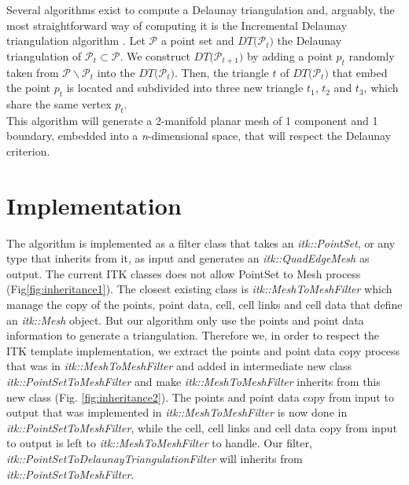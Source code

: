 \documentclass{InsightArticle}
\begin{document}
Several algorithms exist to compute a Delaunay triangulation and, arguably, the most straightforward way of computing it is the Incremental Delaunay triangulation algorithm \cite{Devillers1998}. Let $\mathcal{P}$ a point set and $\mathit{DT(} \mathcal{P_{\mathit{t}}} \mathit{)}$ the Delaunay triangulation of $\mathcal{P_{\mathit{t}}}\subset\mathcal{P}$. We construct $\mathit{DT(} \mathcal{P_{\mathit{t+1}}} \mathit{)}$ by adding a point $\mathit{p_{t}}$ randomly taken from $\mathcal{P} \backslash \mathcal{P_{\mathit{t}}}$ into the $\mathit{DT(} \mathcal{P_{\mathit{t}}} \mathit{)}$. Then, the triangle $\mathit{t}$ of $\mathit{DT(} \mathcal{P_{\mathit{t}}} \mathit{)}$ that embed the point $\mathit{p_{t}}$ is located and subdivided into three new triangle $\mathit{t_{1}}$, $\mathit{t_{2}}$ and $\mathit{t_{3}}$, which share the same vertex $\mathit{p_{t}}$.\\

This algorithm will generate a 2-manifold planar mesh of 1 component and 1 boundary, embedded into a \emph{n}-dimensional space, that will respect the Delaunay criterion.

\section{Implementation}

The algorithm is implemented as a filter class that takes an \emph{itk::PointSet}, or any type that inherits from it, as input and generates an \emph{itk::QuadEdgeMesh} as output. The current ITK classes does not allow PointSet to Mesh process (Fig\ref{fig:inheritance1}). The closest existing class is \emph{itk::MeshToMeshFilter} which manage the copy of the points, point data, cell, cell links and cell data that define an \emph{itk::Mesh} object. But our algorithm only use the points and point data information to generate a triangulation. Therefore we, in order to respect the ITK template implementation, we extract the points and point data copy process that was in \emph{itk::MeshToMeshFilter} and added in intermediate new class \emph{itk::PointSetToMeshFilter} and make \emph{itk::MeshToMeshFilter} inherits from this new class (Fig. \ref{fig:inheritance2}). The points and point data copy from input to output that was implemented in \emph{itk::MeshToMeshFilter} is now done in \emph{itk::PointSetToMeshFilter}, while the cell, cell links and cell data copy from input to output is left to \emph{itk::MeshToMeshFilter} to handle. Our filter, \emph{itk::PointSetToDelaunayTriangulationFilter} will inherits from \emph{itk::PointSetToMeshFilter}.
\end{document}
